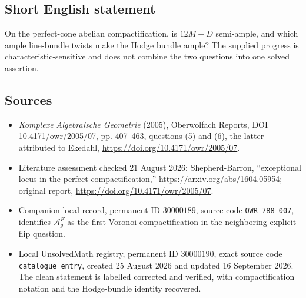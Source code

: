 \documentclass[11pt]{article}
\begin{document}
\subsection{Short English statement}
On the perfect-cone abelian compactification, is $12M-D$ semi-ample, and which ample line-bundle twists make the Hodge bundle ample? The supplied progress is characteristic-sensitive and does not combine the two questions into one solved assertion.
\subsection{Sources}
\begin{itemize}
\item \emph{Komplexe Algebraische Geometrie} (2005), Oberwolfach Reports, DOI 10.4171/owr/2005/07, pp. 407--463, questions (5) and (6), the latter attributed to Ekedahl, \url{https://doi.org/10.4171/owr/2005/07}.
\item Literature assessment checked 21 August 2026: Shepherd-Barron, ``exceptional locus in the perfect compactification,'' \url{https://arxiv.org/abs/1604.05954}; original report, \url{https://doi.org/10.4171/owr/2005/07}.
\item Companion local record, permanent ID $30000189$, source code \texttt{OWR-788-007}, identifies $\mathcal A_g^F$ as the first Voronoi compactification in the neighboring explicit-flip question.
\item Local UnsolvedMath registry, permanent ID $30000190$, exact source code \texttt{catalogue entry}, created 25 August 2026 and updated 16 September 2026. The clean statement is labelled corrected and verified, with compactification notation and the Hodge-bundle identity recovered.
\end{itemize}
\end{document}

